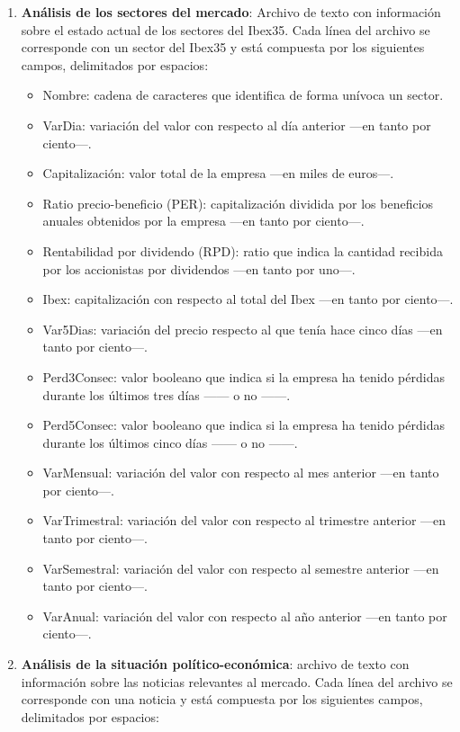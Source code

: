 \documentclass[a4paper, 11pt, titlepage]{article}
\theoremstyle{definition}
\begin{document}
\begin{enumerate}
        \item \textbf{Análisis de los sectores del mercado}: Archivo de texto con información sobre el estado actual de los sectores del Ibex35. Cada línea del archivo se corresponde con un sector del Ibex35 y está compuesta por los siguientes campos, delimitados por espacios:
        \begin{itemize}
            \item Nombre: cadena de caracteres que identifica de forma unívoca un sector.
            \item VarDia: variación del valor con respecto al día anterior ---en tanto por ciento---.
            \item Capitalización: valor total de la empresa ---en miles de euros---.
            \item Ratio precio-beneficio (PER): capitalización dividida por los beneficios anuales obtenidos por la empresa ---en tanto por ciento---.
            \item Rentabilidad por dividendo (RPD): ratio que indica la cantidad recibida por los accionistas por dividendos ---en tanto por uno---.
            \item Ibex: capitalización con respecto al total del Ibex ---en tanto por ciento---.
            \item Var5Dias: variación del precio respecto al que tenía hace cinco días ---en tanto por ciento---.
            \item Perd3Consec: valor booleano que indica si la empresa ha tenido pérdidas durante los últimos tres días ------ o no ------.
            \item Perd5Consec: valor booleano que indica si la empresa ha tenido pérdidas durante los últimos cinco días ------ o no ------.
            \item VarMensual: variación del valor con respecto al mes anterior ---en tanto por ciento---.
            \item VarTrimestral: variación del valor con respecto al trimestre anterior ---en tanto por ciento---.
            \item VarSemestral: variación del valor con respecto al semestre anterior ---en tanto por ciento---.
            \item VarAnual: variación del valor con respecto al año anterior ---en tanto por ciento---.
        \end{itemize}
        \item \textbf{Análisis de la situación político-económica}: archivo de texto con información sobre las noticias relevantes al mercado. Cada línea del archivo se corresponde con una noticia y está compuesta por los siguientes campos, delimitados por espacios:

\end{enumerate}
\end{document}
